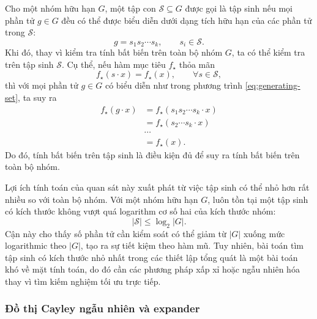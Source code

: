 Cho một nhóm hữu hạn $G$, một tập con $\mathcal{S} \subseteq G$ được gọi là tập sinh nếu mọi phần tử $g \in G$ đều có thể được biểu diễn dưới dạng tích hữu hạn của các phần tử trong $\mathcal{S}$:
\begin{equation}
    g = s_1 s_2 \cdots s_k,
    \qquad s_i \in \mathcal{S}.
    \label{eq:generating-set}
\end{equation}
Khi đó, thay vì kiểm tra tính bất biến trên toàn bộ nhóm $G$, ta có thể kiểm tra trên tập sinh $\mathcal{S}$. Cụ thể, nếu hàm mục tiêu $f_\star$ thỏa mãn
\begin{equation}
    f_\star(s \cdot x) = f_\star(x),
    \qquad \forall s \in \mathcal{S},
    \label{eq:invariance-on-generators}
\end{equation}
thì với mọi phần tử $g \in G$ có biểu diễn như trong phương trình \eqref{eq:generating-set}, ta suy ra
\begin{equation}
\begin{aligned}
    f_\star(g \cdot x)
    &= f_\star(s_1s_2\cdots s_k \cdot x) \\
    &= f_\star(s_2\cdots s_k \cdot x) \\
    &\cdots \\
    &= f_\star(x).
\end{aligned}
    \label{eq:generator-invariance-implies-group-invariance}
\end{equation}
Do đó, tính bất biến trên tập sinh là điều kiện đủ để suy ra tính bất biến trên toàn bộ nhóm.

Lợi ích tính toán của quan sát này xuất phát từ việc tập sinh có thể nhỏ hơn rất nhiều so với toàn bộ nhóm. Với một nhóm hữu hạn $G$, luôn tồn tại một tập sinh có kích thước không vượt quá logarithm cơ số hai của kích thước nhóm:
\begin{equation}
    |\mathcal{S}| \leq \log_2 |G|.
    \label{eq:generator-size-bound}
\end{equation}
Cận này cho thấy số phần tử cần kiểm soát có thể giảm từ $|G|$ xuống mức logarithmic theo $|G|$, tạo ra sự tiết kiệm theo hàm mũ. Tuy nhiên, bài toán tìm tập sinh có kích thước nhỏ nhất trong các thiết lập tổng quát là một bài toán khó về mặt tính toán, do đó cần các phương pháp xấp xỉ hoặc ngẫu nhiên hóa thay vì tìm kiếm nghiệm tối ưu trực tiếp.

\subsubsection{Đồ thị Cayley ngẫu nhiên và expander}

